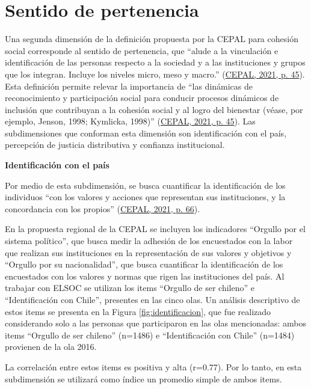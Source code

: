 \documentclass[
  12pt,
]{book}
\begin{document}
\hypertarget{sentido-de-pertenencia}{%
\section{Sentido de pertenencia}\label{sentido-de-pertenencia}}

Una segunda dimensión de la definición propuesta por la CEPAL para cohesión social corresponde al sentido de pertenencia, que ``alude a la vinculación e identificación de las personas respecto a la sociedad y a las instituciones y grupos que los integran. Incluye los niveles micro, meso y macro.'' (\protect\hyperlink{ref-cepal_cohesion_2021}{CEPAL, 2021, p. 45}). Esta definición permite relevar la importancia de ``las dinámicas de reconocimiento y participación social para conducir procesos dinámicos de inclusión que contribuyan a la cohesión social y al logro del bienestar (véase, por ejemplo, Jenson, 1998; Kymlicka, 1998)'' (\protect\hyperlink{ref-cepal_cohesion_2021}{CEPAL, 2021, p. 45}). Las subdimensiones que conforman esta dimensión son identificación con el país, percepción de justicia distributiva y confianza institucional.

\textbf{Identificación con el país}

Por medio de esta subdimensión, se busca cuantificar la identificación de los individuos ``con los valores y acciones que representan sus instituciones, y la concordancia con los propios'' (\protect\hyperlink{ref-cepal_cohesion_2021}{CEPAL, 2021, p. 66}).

En la propuesta regional de la CEPAL se incluyen los indicadores ``Orgullo por el sistema político'', que busca medir la adhesión de los encuestados con la labor que realizan sus instituciones en la representación de sus valores y objetivos y ``Orgullo por su nacionalidad'', que busca cuantificar la identificación de los encuestados con los valores y normas que rigen las instituciones del país. Al trabajar con ELSOC se utilizan los items ``Orgullo de ser chileno'' e ``Identificación con Chile'', presentes en las cinco olas. Un análisis descriptivo de estos items se presenta en la Figura \ref{fig:identificacion}, que fue realizado considerando solo a las personas que participaron en las olas mencionadas: ambos items ``Orgullo de ser chileno'' (n=1486) e ``Identificación con Chile'' (n=1484) provienen de la ola 2016.

La correlación entre estos items es positiva y alta (r=0.77). Por lo tanto, en esta subdimensión se utilizará como índice un promedio simple de ambos items.
\end{document}
